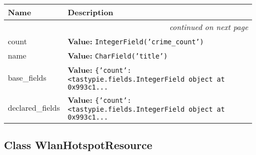     \vspace{-1cm}
\hspace{\varindent}\begin{longtable}{|p{\varnamewidth}|p{\vardescrwidth}|l}
\cline{1-2}
\cline{1-2} \centering \textbf{Name} & \centering \textbf{Description}& \\
\cline{1-2}
\endhead\cline{1-2}\multicolumn{3}{r}{\small\textit{continued on next page}}\\\endfoot\cline{1-2}
\endlastfoot\raggedright c\-o\-u\-n\-t\- & \raggedright \textbf{Value:} 
{\tt IntegerField('crime\_count')}&\\
\cline{1-2}
\raggedright n\-a\-m\-e\- & \raggedright \textbf{Value:} 
{\tt CharField('title')}&\\
\cline{1-2}
\raggedright b\-a\-s\-e\-\_\-f\-i\-e\-l\-d\-s\- & \raggedright \textbf{Value:} 
{\tt \texttt{\{}\texttt{'}\texttt{count}\texttt{'}\texttt{: }{\textless}tastypie.fields.IntegerField object at 0x993c1\texttt{...}}&\\
\cline{1-2}
\raggedright d\-e\-c\-l\-a\-r\-e\-d\-\_\-f\-i\-e\-l\-d\-s\- & \raggedright \textbf{Value:} 
{\tt \texttt{\{}\texttt{'}\texttt{count}\texttt{'}\texttt{: }{\textless}tastypie.fields.IntegerField object at 0x993c1\texttt{...}}&\\
\cline{1-2}
\end{longtable}



\subsection{Class WlanHotspotResource}

